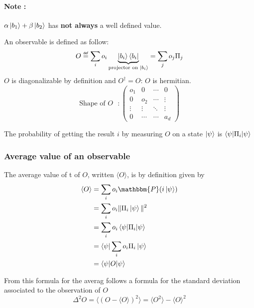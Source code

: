 \documentclass{article}
\newcommand\eqdef{\mathrel{\overset{\makebox[0pt]{\mbox{\normalfont\tiny\sffamily def}}}{=}}}
\begin{document}
\paragraph{Note :} $\alpha\ket{b_1} + \beta\ket{b_2}$ has \textbf{not always} a well defined value.

An observable is defined as follow:
\begin{equation}
    O \eqdef \sum_i o_i \underbrace{\ket{b_i}\bra{b_i}}_{\text{projector on $\ket{b_i}$}}
    = \sum_j o_j \Pi_j
\end{equation}
$O$ is diagonalizable by definition and $O^\dagger = O$: $O$ is hermitian.
$$
\text{Shape of $O$ } :
\begin{pmatrix}
    o_1 & 0 & \cdots & 0 \\
    0 & o_2 & \cdots & \vdots \\
    \vdots  & \vdots  & \ddots & \vdots  \\
    0 & \cdots & \cdots & a_d
\end{pmatrix}
$$

The probability of getting the result $i$ by measuring $O$ on a state $\ket{\psi}$ is $\braket{\psi|\Pi_i|\psi}$
\subsubsection*{Average value of an observable}

The average value of t of $O$, written $\langle O\rangle$, is by definition given by
\begin{equation}
    \begin{aligned}
        \langle O\rangle
            & = \sum_i o_i \mathbbm{P}(i\ket{\psi}) \\
            & = \sum_i o_i \|\Pi_i\ket{\psi}\|^2 \\
            & = \sum_i o_i \braket{\psi|\Pi_i|\psi} \\
            & = \bra{\psi}\sum_i o_i \Pi_i \ket{\psi} \\
            & = \braket{\psi | O |\psi}
    \end{aligned}
\end{equation}

From this formula for the averag follows a formula for the standard deviation associated to the observation of $O$
\begin{equation}
    \Delta^2 O = \langle(O - \langle O \rangle)^2\rangle = \langle O^2 \rangle - \langle O \rangle^2
\end{equation}
\end{document}
